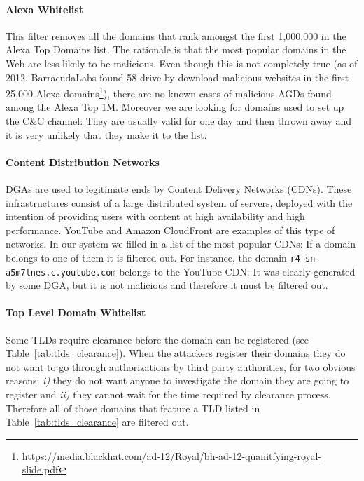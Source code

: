 \paragraph{Alexa Whitelist} %
\label{par:alexa_whitelist}
This filter removes all the domains that rank amongst the first 1,000,000 in the Alexa Top
Domains list. The rationale is that the most popular domains in the Web are less likely to be malicious.
Even though this is not completely true (as of 2012, BarracudaLabs found 58 drive-by-download
malicious websites in the first 25,000 Alexa domains\footnote{\url{https://media.blackhat.com/ad-12/Royal/bh-ad-12-quanitfying-royal-slide.pdf}}), there are no known cases of malicious AGDs found among the Alexa Top 1M. Moreover we are looking for domains
used to set up the C\&C channel: They are usually valid for one day and then thrown away and
it is very unlikely that they make it to the list.

\paragraph{Content Distribution Networks} %
\label{par:content_distribution_networks}
DGAs are used to legitimate ends by Content Delivery Networks (CDNs). These
infrastructures consist of a large distributed system of servers, deployed with the
intention of providing users with content at high availability and high performance.
YouTube and Amazon CloudFront are examples of this type of networks. In our system we
filled in a list of the most popular CDNs: If a domain belongs to one of them it is
filtered out. For instance, the domain \texttt{r4---sn-a5m7lnes.c.youtube.com}
belongs to the YouTube CDN: It was clearly generated by some DGA, but it is not
malicious and therefore it must be filtered out.

\paragraph{Top Level Domain Whitelist} %
\label{par:top_level_domain_whitelist}

Some TLDs require clearance before the domain can be registered (see Table~\ref{tab:tlds_clearance}). When the attackers register their domains they do not want to go through authorizations
by third party authorities, for two obvious reasons: \emph{i)} they do not want anyone to
investigate the domain they are going to register and \emph{ii)} they cannot wait for the time required by
clearance process. Therefore all of those domains that feature a TLD listed in Table~\ref{tab:tlds_clearance} are filtered out.

